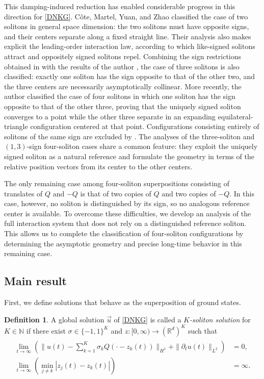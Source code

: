 \documentclass[reqno]{amsart}
\theoremstyle{plain}
\theoremstyle{definition}
\newtheorem{definition}{Definition}[section]
\numberwithin{equation}{section}
\begin{document}
This damping-induced reduction has enabled considerable progress in this direction for \eqref{DNKG}. C\^{o}te, Martel, Yuan, and Zhao \cite{CMYZ} classified the case of two solitons in general space dimension: the two solitons must have opposite signs, and their centers separate along a fixed straight line. Their analysis also makes explicit the leading-order interaction law, according to which like-signed solitons attract and oppositely signed solitons repel. Combining the sign restrictions obtained in \cite{CD} with the results of the author \cite{I2}, the case of three solitons is also classified: exactly one soliton has the sign opposite to that of the other two, and the three centers are necessarily asymptotically collinear. More recently, the author \cite{I3} classified the case of four solitons in which one soliton has the sign opposite to that of the other three, proving that the uniquely signed soliton converges to a point while the other three separate in an expanding equilateral-triangle configuration centered at that point. Configurations consisting entirely of solitons of the same sign are excluded by \cite{CD}. The analyses of the three-soliton and $(1,3)$-sign four-soliton cases share a common feature: they exploit the uniquely signed soliton as a natural reference and formulate the geometry in terms of the relative position vectors from its center to the other centers.


The only remaining case among four-soliton superpositions consisting of translates of $Q$ and $-Q$ is that of two copies of $Q$ and two copies of $-Q$. In this case, however, no soliton is distinguished by its sign, so no analogous reference center is available. To overcome these difficulties, we develop an analysis of the full interaction system that does not rely on a distinguished reference soliton. This allows us to complete the classification of four-soliton configurations by determining the asymptotic geometry and precise long-time behavior in this remaining case.



\subsection{Main result}
First, we define solutions that behave as the superposition of ground states.
\begin{definition}\label{defKsoli}
A global solution $\vec{u}$ of \eqref{DNKG} is called a \textit{$K$-soliton solution} for $K\in\mathbb{N}$ if there exist $\sigma \in \{-1,1\}^K$ and $z:[0,\infty)\to (\mathbb{R}^d)^K$ such that 
\begin{align}
\label{Ksoli}
\begin{aligned}
\lim_{t\to \infty} \left(\|u(t)-\sum_{k=1}^K\sigma_k Q(\cdot-z_k(t))\|_{H^1}+\|{\partial}_tu(t)\|_{L^2}\right)&=0,
\\
\lim_{t\to\infty}\left( \min_{j\neq k}|z_j(t)-z_k(t)|\right)&=\infty.
\end{aligned}
\end{align}
\end{definition}
\end{document}
